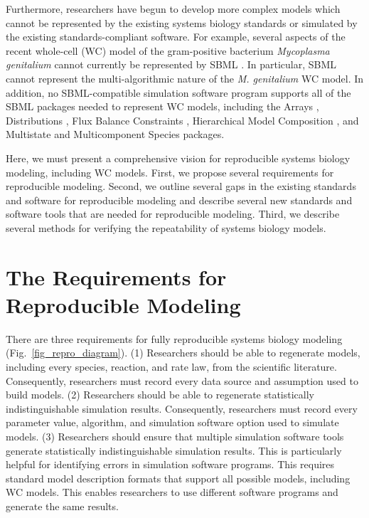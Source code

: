 \documentclass[journal,transmag,twoside]{IEEEtran}
\begin{document}
Furthermore, researchers have begun to develop more complex models which cannot be represented by the existing systems biology standards or simulated by the existing standards-compliant software. For example, several aspects of the recent whole-cell (WC) model of the gram-positive bacterium \textit{Mycoplasma genitalium} \cite{Karr2012} cannot currently be represented by SBML \cite{Waltemath2016}. In particular, SBML cannot represent the multi-algorithmic nature of the \textit{M. genitalium} WC model. In addition, no SBML-compatible simulation software program supports all of the SBML packages needed to represent WC models, including the Arrays \cite{watanabe2016efficient}, Distributions \cite{Moodie2015}, Flux Balance Constraints \cite{olivier2015fbc}, Hierarchical Model Composition \cite{smith2015sbml}, and Multistate and Multicomponent Species \cite{SBMLMulti} packages.

Here, we must present a comprehensive vision for reproducible systems biology modeling, including WC models. First, we propose several requirements for reproducible modeling. Second, we outline several gaps in the existing standards and software for reproducible modeling and describe several new standards and software tools that are needed for reproducible modeling. Third, we describe several methods for verifying the repeatability of systems biology models.

\section{The Requirements for Reproducible Modeling}

There are three requirements for fully reproducible systems biology modeling (Fig.~\ref{fig_repro_diagram}). (1) Researchers should be able to regenerate models, including every species, reaction, and rate law, from the scientific literature. Consequently, researchers must record every data source and assumption used to build models. (2) Researchers should be able to regenerate statistically indistinguishable simulation results. Consequently, researchers must record every parameter value, algorithm, and simulation software option used to simulate models. (3) Researchers should ensure that multiple simulation software tools generate statistically indistinguishable simulation results. This is particularly helpful for identifying errors in simulation software programs. This requires standard model description formats that support all possible models, including WC models. This enables researchers to use different software programs and generate the same results.
\end{document}
